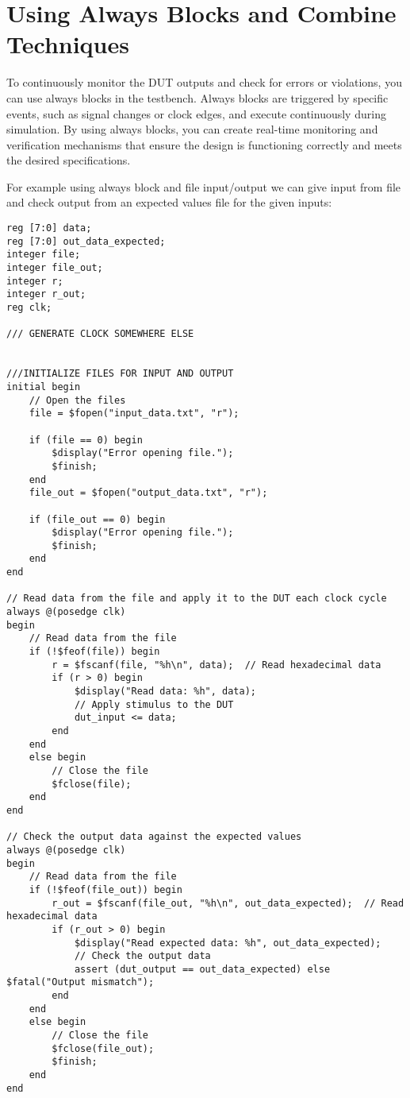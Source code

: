 \documentclass{report}
\begin{document}
\section{Using Always Blocks and Combine Techniques}
To continuously monitor the DUT outputs and check for errors or violations, you can use always blocks in the testbench. Always blocks are triggered by specific events, such as signal changes or clock edges, and execute continuously during simulation. By using always blocks, you can create real-time monitoring and verification mechanisms that ensure the design is functioning correctly and meets the desired specifications.

For example using always block and file input/output we can give input from file and check output from an expected values file for the given inputs:
\begin{verbatim}
reg [7:0] data;
reg [7:0] out_data_expected;
integer file;
integer file_out;
integer r;
integer r_out;
reg clk;

/// GENERATE CLOCK SOMEWHERE ELSE


///INITIALIZE FILES FOR INPUT AND OUTPUT
initial begin
    // Open the files
    file = $fopen("input_data.txt", "r");

    if (file == 0) begin
        $display("Error opening file.");
        $finish;
    end
    file_out = $fopen("output_data.txt", "r");

    if (file_out == 0) begin
        $display("Error opening file.");
        $finish;
    end
end
    
// Read data from the file and apply it to the DUT each clock cycle
always @(posedge clk)
begin
    // Read data from the file
    if (!$feof(file)) begin
        r = $fscanf(file, "%h\n", data);  // Read hexadecimal data
        if (r > 0) begin
            $display("Read data: %h", data);
            // Apply stimulus to the DUT
            dut_input <= data;
        end
    end
    else begin
        // Close the file
        $fclose(file);
    end
end

// Check the output data against the expected values
always @(posedge clk)
begin
    // Read data from the file
    if (!$feof(file_out)) begin
        r_out = $fscanf(file_out, "%h\n", out_data_expected);  // Read hexadecimal data
        if (r_out > 0) begin
            $display("Read expected data: %h", out_data_expected);
            // Check the output data
            assert (dut_output == out_data_expected) else $fatal("Output mismatch");
        end
    end
    else begin
        // Close the file
        $fclose(file_out);
        $finish;
    end
end
\end{verbatim}
\end{document}
